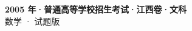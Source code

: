 \documentclass[zihao=-4, a4paper]{ctexart}
\begin{document}
\begin{center}
  {\Large\bfseries 2005 年·普通高等学校招生考试·江西卷·文科}\\[4pt]
  {\large 数学 · 试题版}
\end{center}
\medskip
{}

\end{document}
